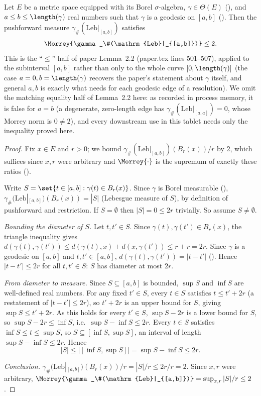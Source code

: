 \begin{lemma}
  Let $E$ be a metric space equipped with its Borel $\sigma$-algebra, $\gamma \in \Theta(E)$
  (), and $a \le b \le \length(\gamma)$ real numbers such that $\gamma$ is a
  geodesic on $[a,b]$ (). Then the pushforward measure
  $\gamma_\#(\mathrm{Leb}|_{[a,b]})$ satisfies
  \[
    \Morrey{\gamma_\#(\mathrm{Leb}|_{[a,b]})} \le 2
    .
  \]
  This is the ``$\le$'' half of paper Lemma~2.2 (paper.tex lines 501--507), applied to the
  subinterval $[a,b]$ rather than only to the whole curve $[0,\length(\gamma)]$ (the case
  $a=0,b=\length(\gamma)$ recovers the paper's statement about $\gamma$ itself, and general $a,b$ is
  exactly what  needs for each geodesic edge of a resolution). We omit the
  matching equality half of Lemma~2.2 here: as recorded in process memory, it is false for
  $a=b$ (a degenerate, zero-length edge has $\gamma_\#(\mathrm{Leb}|_{[a,a]}) = 0$, whose Morrey
  norm is $0 \ne 2$), and every downstream use in this tablet needs only the inequality proved here.
\end{lemma}
\begin{proof}
  Fix $x \in E$ and $r > 0$; we bound
  $\gamma_\#(\mathrm{Leb}|_{[a,b]})(B_r(x))/r$ by $2$, which suffices since $x,r$ were arbitrary and
  $\Morrey{\cdot}$ is the supremum of exactly these ratios ().

  Write $S = \set{t \in [a,b] : \gamma(t) \in B_r(x)}$. Since $\gamma$ is Borel measurable
  (), $\gamma_\#(\mathrm{Leb}|_{[a,b]})(B_r(x)) = |S|$ (Lebesgue measure of
  $S$), by definition of pushforward and restriction. If $S = \emptyset$ then $|S|=0 \le 2r$
  trivially. So assume $S \ne \emptyset$.

  \emph{Bounding the diameter of $S$.} Let $t, t' \in S$. Since $\gamma(t), \gamma(t') \in B_r(x)$,
  the triangle inequality gives
  $d(\gamma(t),\gamma(t')) \le d(\gamma(t),x) + d(x,\gamma(t')) \le r + r = 2r$. Since $\gamma$ is a
  geodesic on $[a,b]$ and $t,t' \in [a,b]$, $d(\gamma(t),\gamma(t')) = |t-t'|$
  (). Hence $|t - t'| \le 2r$ for all $t,t' \in S$: $S$ has diameter at most
  $2r$.

  \emph{From diameter to measure.} Since $S \subseteq [a,b]$ is bounded, $\sup S$ and $\inf S$ are
  well-defined real numbers. For any fixed $t' \in S$, every $t \in S$ satisfies $t \le t' + 2r$ (a
  restatement of $|t-t'|\le 2r$), so $t'+2r$ is an upper bound for $S$, giving $\sup S \le t' + 2r$.
  As this holds for every $t' \in S$, $\sup S - 2r$ is a lower bound for $S$, so
  $\sup S - 2r \le \inf S$, i.e.\ $\sup S - \inf S \le 2r$. Every $t \in S$ satisfies
  $\inf S \le t \le \sup S$, so $S \subseteq [\inf S, \sup S]$, an interval of length
  $\sup S - \inf S \le 2r$. Hence
  \[
    |S| \le |[\inf S, \sup S]| = \sup S - \inf S \le 2r
    .
  \]

  \emph{Conclusion.} $\gamma_\#(\mathrm{Leb}|_{[a,b]})(B_r(x)) / r = |S|/r \le 2r/r = 2$. Since
  $x,r$ were arbitrary, $\Morrey{\gamma_\#(\mathrm{Leb}|_{[a,b]})} = \sup_{x,r} |S|/r \le 2$.
\end{proof}

